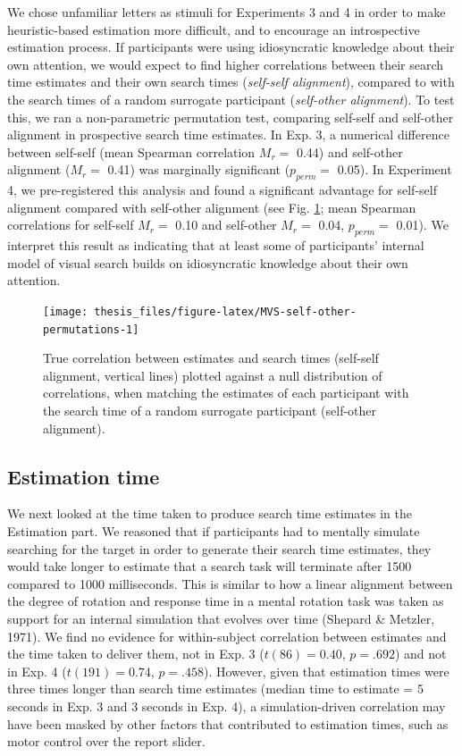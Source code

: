 \documentclass[12pt,twoside]{reedthesis}
\begin{document}
We chose unfamiliar letters as stimuli for Experiments 3 and 4 in order to make heuristic-based estimation more difficult, and to encourage an introspective estimation process. If participants were using idiosyncratic knowledge about their own attention, we would expect to find higher correlations between their search time estimates and their own search times (\emph{self-self alignment}), compared to with the search times of a random surrogate participant (\emph{self-other alignment}). To test this, we ran a non-parametric permutation test, comparing self-self and self-other alignment in prospective search time estimates. In Exp. 3, a numerical difference between self-self (mean Spearman correlation \(M_r=\) 0.44) and self-other alignment (\(M_r=\) 0.41) was marginally significant (\(p_{perm}=\) 0.05). In Experiment 4, we pre-registered this analysis and found a significant advantage for self-self alignment compared with self-other alignment (see Fig. \ref{fig:MVS-self-other-permutations}; mean Spearman correlations for self-self \(M_r=\) 0.10 and self-other \(M_r=\) 0.04, \(p_{perm}=\) 0.01). We interpret this result as indicating that at least some of participants' internal model of visual search builds on idiosyncratic knowledge about their own attention.
\begin{figure}
\texttt{[image: thesis\_files/figure-latex/MVS-self-other-permutations-1]} \caption[Self-self versus self-other alignment in Experiments 3 and 4]{True correlation between estimates and search times (self-self alignment, vertical lines) plotted against a null distribution of correlations, when matching the estimates of each participant with the search time of a random surrogate participant (self-other alignment).}\label{fig:MVS-self-other-permutations}
\end{figure}
\hypertarget{estimation-time}{%
\subsection*{Estimation time}\label{estimation-time}}

We next looked at the time taken to produce search time estimates in the Estimation part. We reasoned that if participants had to mentally simulate searching for the target in order to generate their search time estimates, they would take longer to estimate that a search task will terminate after 1500 compared to 1000 milliseconds. This is similar to how a linear alignment between the degree of rotation and response time in a mental rotation task was taken as support for an internal simulation that evolves over time (Shepard \& Metzler, 1971). We find no evidence for within-subject correlation between estimates and the time taken to deliver them, not in Exp. 3 (\(t(86) = 0.40\), \(p = .692\)) and not in Exp. 4 (\(t(191) = 0.74\), \(p = .458\)). However, given that estimation times were three times longer than search time estimates (median time to estimate = 5 seconds in Exp. 3 and 3 seconds in Exp. 4), a simulation-driven correlation may have been masked by other factors that contributed to estimation times, such as motor control over the report slider.
\end{document}
